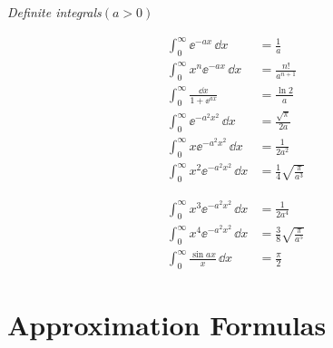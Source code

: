 \begin{center}
\begin{minipage}{\textwidth}
\centering
\textit{Definite integrals}\quad $(a>0)$\\[6pt]
\begin{minipage}[t]{0.47\textwidth}
\begin{align*}
\int_0^\infty \ee^{-ax}\,\dd x &= \frac1a\\
\int_0^\infty x^n \ee^{-ax}\,\dd x &= \frac{n!}{a^{n+1}}\\
\int_0^\infty\frac{\dd x}{1+\ee^{ax}} &= \frac{\ln 2}{a}\\
\int_0^\infty \ee^{-a^2x^2}\,\dd x &= \frac{\sqrt{\pi}}{2a}\\
\int_0^\infty x \ee^{-a^2x^2}\,\dd x &= \frac{1}{2a^2}\\
\int_0^\infty x^2 \ee^{-a^2x^2}\,\dd x &= \frac14\sqrt{\frac{\pi}{a^3}}
\end{align*}
\end{minipage}\hfill
\begin{minipage}[t]{0.47\textwidth}
\begin{align*}
\int_0^\infty x^3 \ee^{-a^2x^2}\,\dd x &= \frac{1}{2a^4}\\
\int_0^\infty x^4 \ee^{-a^2x^2}\,\dd x &= \frac38\sqrt{\frac{\pi}{a^5}}\\
\int_0^\infty\frac{\sin ax}{x}\,\dd x &= \frac{\pi}{2}
\end{align*}
\end{minipage}
\end{minipage}
\end{center}

\section*{Approximation Formulas}


